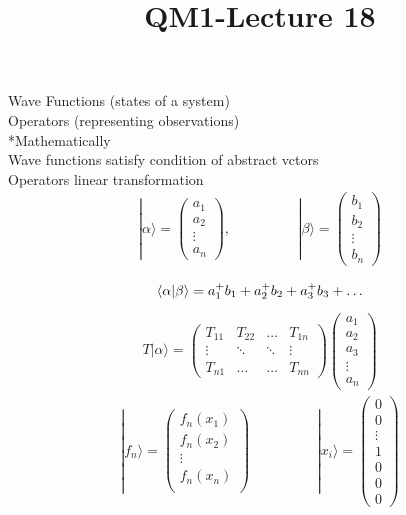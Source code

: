 \documentclass{article}
\begin{document}
\title{QM1-Lecture 18}
\maketitle

Wave Functions  (states of a system)\\

Operators   (representing observations)\\

*Mathematically\\

Wave functions satisfy condition of abstract vctors\\

Operators linear transformation\\
\begin{align*}
|\alpha\rangle=\begin{pmatrix}
a_{1}\\
a_{2}\\
\vdots\\
a_{n}
\end{pmatrix}, \hspace{2cm} |\beta\rangle=\begin{pmatrix}
b_{1}\\
b_{2}\\
\vdots\\
b_{n}
\end{pmatrix}\\
\end{align*}
\begin{align*}
\ev{\alpha|\beta}=a_{1}^{+}b_{1}+a_{2}^{+}b_{2}+a_{3}^{+}b_{3}+\hdots\\
\end{align*}
\begin{align*}
T|\alpha\rangle=\begin{pmatrix}
T_{11}&T_{22}&\hdots&T_{1n}\\
\vdots&\ddots&\ddots&\vdots\\
T_{n1}&\hdots&\hdots&T_{nn}
\end{pmatrix}\begin{pmatrix}
a_{1}\\
a_{2}\\
a_{3}\\
\vdots\\
a_{n}
\end{pmatrix}
\end{align*}
\begin{align*}
|f_{n}\rangle=\begin{pmatrix}
f_{n}(x_{1})\\
f_{n}(x_{2})\\
\vdots\\
f_{n}(x_{n})\\
\end{pmatrix} \hspace{2cm}|x_{i}\rangle=\begin{pmatrix}
0\\
0\\
\vdots\\
1\\
0\\
0\\
0
\end{pmatrix}
\end{align*}
\end{document}
